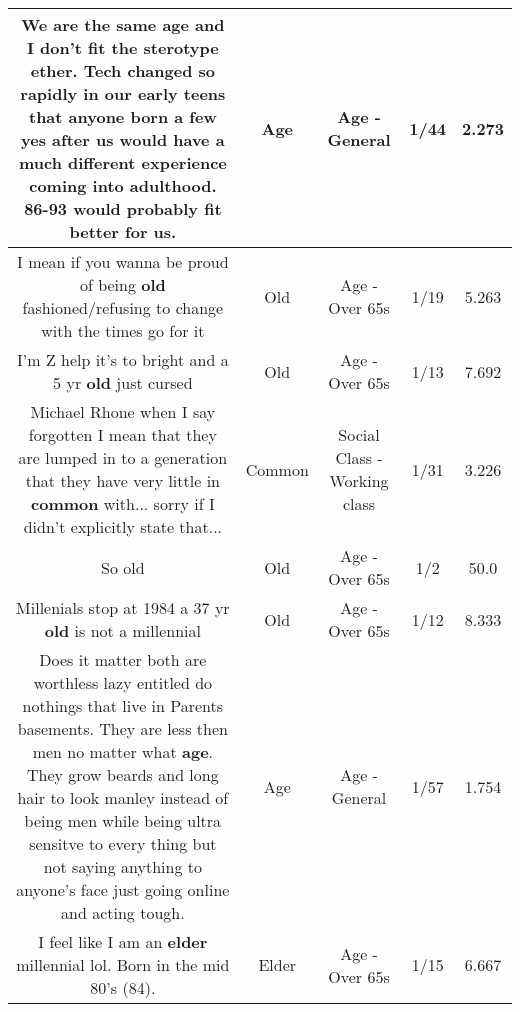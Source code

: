 \documentclass[11pt]{article}
\newlength\mylength
\begin{document}
\begin{center}
\begin{longtable}{|C{.65\mylength}|C{.30\mylength}|C{.12\mylength}|C{.12\mylength}|C{.12\mylength}|}
  \small We are the same \textbf{age} and I don't fit the sterotype ether. Tech changed so rapidly in our early teens that anyone born a few yes after us would have a much different experience coming into adulthood. 86-93 would probably fit better for us.\normalsize   & Age & Age - General & 1/44 & 2.273 \\  \hline
  \small I mean if you wanna be proud of being \textbf{old} fashioned/refusing to change with the times go for it\normalsize   & Old & Age - Over 65s & 1/19 & 5.263 \\  \hline
  \small I'm Z help it's to bright and a 5 yr \textbf{old} just cursed\normalsize   & Old & Age - Over 65s & 1/13 & 7.692 \\  \hline
  \small Michael Rhone when I say forgotten I mean that they are lumped in to a generation that they have very little in \textbf{common} with... sorry if I didn't explicitly state that...\normalsize   & Common & Social Class - Working class & 1/31 & 3.226 \\  \hline
  \small So old\normalsize   & Old & Age - Over 65s & 1/2 & 50.0 \\  \hline
  \small Millenials stop at 1984 a 37 yr \textbf{old} is not a millennial\normalsize   & Old & Age - Over 65s & 1/12 & 8.333 \\  \hline
  \small Does it matter both are worthless lazy entitled do nothings that live in Parents basements. They are less then men no matter what \textbf{age}. They grow beards and long hair to look manley instead of being men while being ultra sensitve to every thing but not saying anything to anyone's face just going online and acting tough.\normalsize   & Age & Age - General & 1/57 & 1.754 \\  \hline
  \small I feel like I am an \textbf{elder} millennial lol. Born in the mid 80's (84).\normalsize   & Elder & Age - Over 65s & 1/15 & 6.667 \\  \hline

\end{longtable}
\end{center}
\end{document}
